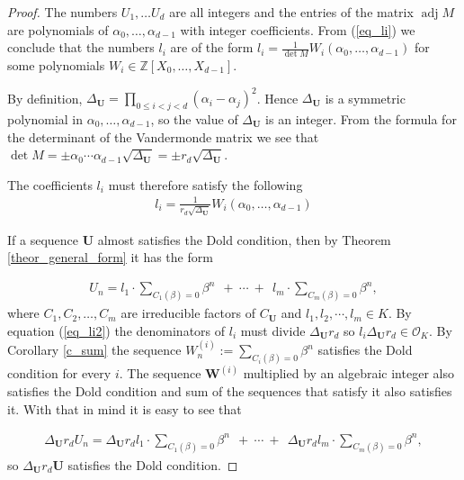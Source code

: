 \documentclass[preprint,12pt]{elsarticle}
\newcommand{\Z}{\mathbb{Z}}
\newcommand{\OO}{\mathcal{O}}
\newcommand{\alphas}{\alpha_0,\ldots,\alpha_{d-1}}
\DeclareMathOperator{\adj}{adj}
\begin{document}
\begin{proof}
The numbers $ U_1, \ldots  U_{d}$ are all integers and the entries of the matrix $\adj M$ are polynomials of $\alphas$ with integer coefficients. From (\ref{eq_li}) we conclude that the numbers $l_i$ are of the form $l_i = \frac{1}{\det M}W_i(\alphas)$ for some polynomials $W_i\in\Z[X_0,\ldots ,X_{d-1}]$.

By definition, $\Delta_{\mathbf U} = \prod_{0\leqslant i<j<d}(\alpha_i-\alpha_j)^2$. Hence $\Delta_{\mathbf U}$ is a symmetric polynomial in $\alpha_0,\ldots,\alpha_{d-1}$, so the value of $\Delta_{\mathbf U}$ is an integer. From the formula for the determinant of the Vandermonde matrix we see that $\det M = \pm \alpha_0\cdots\alpha_{d-1} \sqrt{\Delta_{\mathbf U}} =  \pm r_d \sqrt{\Delta_{\mathbf U}}$.

The coefficients $l_i$ must therefore satisfy the following
\begin{align} \label{eq_li2}
    l_i = \frac{1}{r_d\sqrt{\Delta_\mathbf{U}}}W_i(\alphas)
\end{align}


If a sequence $\mathbf{U}$ almost satisfies the Dold condition, then by Theorem \ref{theor_general_form} it has the form 

\begin{align}
        U_n = l_1\cdot\sum_{C_1(\beta)=0} \beta^n   \ \ +\ \cdots\ + \ \
        l_m\cdot\sum_{C_m(\beta)=0} \beta^n ,   
\end{align}
where $C_1, C_2, \ldots, C_m$ are irreducible factors of $C_{\mathbf U}$ and $l_1, l_2, \cdots, l_m \in K$. By equation (\ref{eq_li2}) the denominators of $l_i$ must divide $\Delta_\mathbf{U}r_d$ so $l_i\Delta_\mathbf{U}r_d \in \OO_K$. By Corollary \ref{c_sum} the sequence ${W}^{(i)}_n := \sum_{C_i(\beta)=0} \beta^n$ satisfies the Dold condition for every $i$. The sequence $\mathbf{W}^{(i)}$ multiplied by an algebraic integer also satisfies the Dold condition and sum of the sequences that satisfy it also satisfies it. With that in mind it is easy to see that 

\begin{align}
        \Delta_\mathbf{U}r_d U_n = \Delta_\mathbf{U}r_dl_1\cdot\sum_{C_1(\beta)=0} \beta^n   \ \ +\ \cdots\ + \ \
        \Delta_\mathbf{U}r_dl_m\cdot\sum_{C_m(\beta)=0} \beta^n ,   
\end{align}
so $\Delta_\mathbf{U}r_d\mathbf U$ satisfies the Dold condition.

\end{proof}
\end{document}
